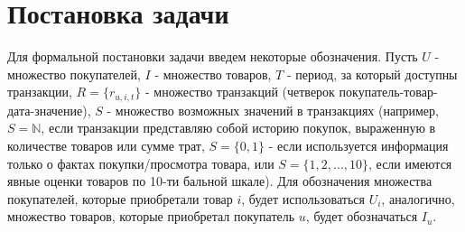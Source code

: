 \documentclass{article}
\begin{document}



\section{Постановка задачи}


Для формальной постановки задачи введем некоторые обозначения. Пусть $U$ - множество покупателей, $I$ - множество товаров, $T$ - период, за который доступны транзакции, $R = \{r_{u, i, t}\}$ - множество транзакций (четверок покупатель-товар-дата-значение), $S$ - множество возможных значений в транзакциях (например, $S = \mathbb{N}$, если транзакции представляю собой историю покупок, выраженную в количестве товаров или сумме трат, $S = \{0, 1\}$ - если используется информация только о фактах покупки/просмотра товара, или $S = \{1, 2,..., 10\}$, если имеются явные оценки товаров по 10-ти бальной шкале). Для обозначения множества покупателей, которые приобретали товар $i$, будет использоваться $U_i$, аналогично, множество товаров, которые приобретал покупатель $u$, будет обозначаться $I_u$. \par
 
\end{document}
